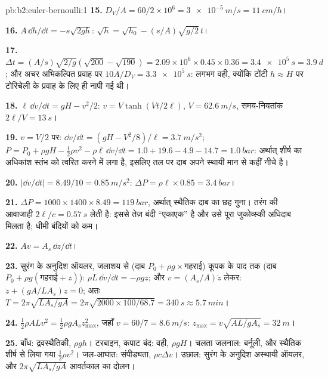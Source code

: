 \begin{solution}{pb:b2:euler-bernoulli:1}
\textbf{15.} $D_V/A = 60/2 \times 10^6 = \qty{3e-5}{m/s} = \qty{11}{cm/h}$।

\textbf{16.} $A\,\dd h/\dd t = -s\sqrt{2gh}$: $\sqrt h = \sqrt{h_0} - (s/A)\sqrt{g/2}\,t$।

\textbf{17.} $\Delta t = (A/s)\sqrt{2/g}(\sqrt{200} - \sqrt{190}) = 2.09 \times 10^6 \times
0.45 \times 0.36 = \qty{3.4e5}{s} = \qty{3.9}{d}$; और अचर अभिकल्पित प्रवाह पर
$10A/D_V = \qty{3.3e5}{s}$: लगभग वही, क्योंकि टोंटी $h \approx H$ पर
टोरिचेली के प्रवाह के लिए ही नापी गई थी।

\textbf{18.} $\ell\,\dd v/\dd t = gH - v^2/2$: $v = V\tanh(Vt/2\ell)$, $V = \qty{62.6}{m/s}$,
समय-नियतांक $2\ell/V = \qty{13}{s}$।

\textbf{19.} $v = V/2$ पर: $\dd v/\dd t = (gH - V^2/8)/\ell = \qty{3.7}{m/s^2}$;
$P = P_0 + \rho gH - \tfrac12\rho v^2 - \rho\ell\,\dd v/\dd t = 1.0 + 19.6 - 4.9 - 14.7
= \qty{1.0}{bar}$: अर्थात् शीर्ष का अधिकांश स्तंभ को त्वरित करने में लगा है, इसलिए
तल पर दाब अपने स्थायी मान से कहीं नीचे है।

\textbf{20.} $|\dd v/\dd t| = 8.49/10 = \qty{0.85}{m/s^2}$: $\Delta P = \rho\ell \times 0.85 =
\qty{3.4}{bar}$।

\textbf{21.} $\Delta P = 1000 \times 1400 \times 8.49 = \qty{119}{bar}$, अर्थात् स्थैतिक
दाब का छह गुना। तरंग की आवाजाही $2\ell/c = \qty{0.57}{s}$ लेती है: इससे
तेज़ बंदी ``एकाएक'' है और उसे पूरा जुकोव्स्की अधिदाब मिलता है;
धीमी बंदियों को कम।

\textbf{22.} $Av = A_s\,\dd z/\dd t$।

\textbf{23.} सुरंग के अनुदिश ऑयलर, जलाशय से (दाब
$P_0 + \rho g\times$गहराई) कूपक के पाद तक (दाब $P_0 + \rho g
(\text{गहराई} + z)$): $\rho L\,\dd v/\dd t = -\rho gz$; और $v = (A_s/A)\dot z$ लेकर:
$\ddot z + (gA/LA_s)z = 0$; अतः $T = 2\pi\sqrt{LA_s/gA} = 2\pi\sqrt{2000 \times 100/
68.7} = \qty{340}{s} \approx \qty{5.7}{min}$।

\textbf{24.} $\tfrac12\rho ALv^2 = \tfrac12\rho gA_sz_{\max}^2$, जहाँ $v = 60/7 =
\qty{8.6}{m/s}$: $z_{\max} = v\sqrt{AL/gA_s} = \qty{32}{m}$।

\textbf{25.} बाँध: द्रवस्थैतिकी, $\rho gh$। टरबाइन, कपाट बंद: वही,
$\rho gH$। चलता जलनाल: बर्नूली, और स्थैतिक शीर्ष से लिया गया
$\tfrac12\rho v^2$। जल-आघात: संपीड्यता, $\rho c\Delta v$।
उछाल: सुरंग के अनुदिश अस्थायी ऑयलर, और
$2\pi\sqrt{LA_s/gA}$ आवर्तकाल का दोलन।
\end{solution}
